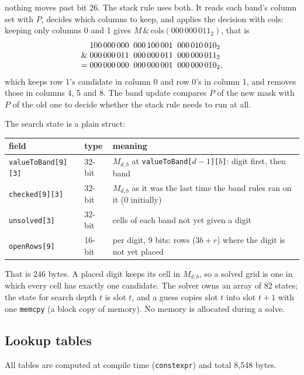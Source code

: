 \documentclass[11pt]{article}
\theoremstyle{definition}
\theoremstyle{plain}
\begin{document}
nothing moves past bit 26. The stack rule uses both. It reads each band's column set with $P$, decides which columns
to keep, and applies the decision with $\mathrm{cols}$: keeping only columns 0 and 1 gives
$M \,\&\, \mathrm{cols}(000\,000\,011_2)$, that is
\[ \begin{array}{r@{\;}l}
 & 100\,000\,000\;\;000\,100\,001\;\;000\,010\,010_2 \\
 \& & 000\,000\,011\;\;000\,000\,011\;\;000\,000\,011_2 \\
 = & 000\,000\,000\;\;000\,000\,001\;\;000\,000\,010_2,
\end{array} \]
which keeps row 1's candidate in column 0 and row 0's in column 1,
and removes those in columns 4, 5 and 8. The band update compares $P$ of the new mask with $P$ of the old one to decide
whether the stack rule needs to run at all.

The search state is a plain struct:

\begin{center}
\small
\begin{tabular}{lll}
\toprule
field & type & meaning \\
\midrule
\texttt{valueToBand[9][3]} & 32-bit & $M_{d,b}$ at \texttt{valueToBand[$d-1$][$b$]}: digit first, then band \\
\texttt{checked[9][3]} & 32-bit & $M_{d,b}$ as it was the last time the band rules ran on it (0 initially) \\
\texttt{unsolved[3]} & 32-bit & cells of each band not yet given a digit \\
\texttt{openRows[9]} & 16-bit & per digit, 9 bits: rows ($3b+r$) where the digit is not yet placed \\
\bottomrule
\end{tabular}
\end{center}

\noindent That is 246 bytes. A placed digit keeps its cell in $M_{d,b}$, so a solved grid is one in which every cell
has exactly one candidate. The solver owns an array of 82 states; the state for search depth $t$ is slot $t$, and a
guess copies slot $t$ into slot $t{+}1$ with one \texttt{memcpy} (a block copy of
memory). No memory is allocated during a solve.

\subsection{Lookup tables}

All tables are computed at compile time (\texttt{constexpr}) and total 8{,}548 bytes.
\end{document}
